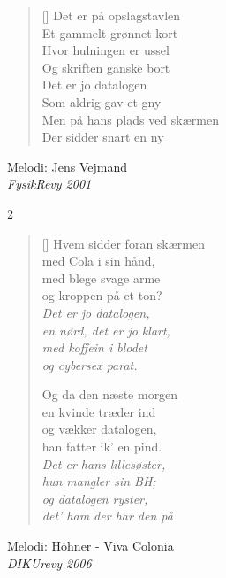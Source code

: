 \begin{multicols}
\begin{verse}[\versewidth]
Det er på opslagstavlen\\
Et gammelt grønnet kort\\
Hvor hulningen er ussel\\
Og skriften ganske bort\\
Det er jo datalogen\\
Som aldrig gav et gny\\
Men på hans plads ved skærmen\\
Der sidder snart en ny
\end{verse}
\end{multicols}


{Melodi: Jens Vejmand}\\[.2em]
{\small\itshape FysikRevy 2001}

\begin{multicols}2
\settowidth{\versewidth}{Og da den næste morgen}
\begin{verse}[\versewidth]
Hvem sidder foran skærmen\\
med Cola i sin hånd,\\
med blege svage arme\\
og kroppen på et ton?\\
\emph{Det er jo datalogen,\\
en nørd, det er jo klart,\\
med koffein i blodet\\
og cybersex parat.}

Og da den næste morgen\\
en kvinde træder ind\\
og vækker datalogen,\\
han fatter ik' en pind.\\
\emph{Det er hans lillesøster,\\
hun mangler sin BH;\\
og datalogen ryster,\\
det' ham der har den på}
\end{verse}
\end{multicols}

\newpage

{Melodi: Höhner - Viva Colonia}\\[.2em]
{\small\itshape DIKUrevy 2006}

